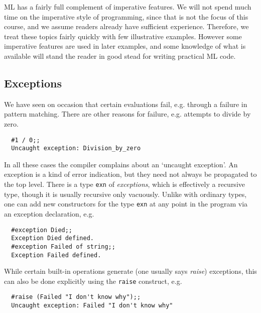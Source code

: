 ML has a fairly full complement of imperative features. We will not spend much
time on the imperative style of programming, since that is not the focus of
this course, and we assume readers already have sufficient experience.
Therefore, we treat these topics fairly quickly with few illustrative examples.
However some imperative features are used in later examples, and some knowledge
of what is available will stand the reader in good stead for writing practical
ML code.

\subsection{Exceptions}

We have seen on occasion that certain evaluations fail, e.g. through a failure
in pattern matching. There are other reasons for failure, e.g. attempts to
divide by zero.

\begin{boxed}\begin{verbatim}
  #1 / 0;;
  Uncaught exception: Division_by_zero
\end{verbatim}\end{boxed}

In all these cases the compiler complains about an `uncaught exception'. An
exception is a kind of error indication, but they need not always be propagated
to the top level. There is a type {\tt exn} of {\em exceptions}, which is
effectively a recursive type, though it is usually recursive only vacuously.
Unlike with ordinary types, one can add new constructors for the type {\tt exn}
at any point in the program via an exception declaration, e.g.

\begin{boxed}\begin{verbatim}
  #exception Died;;
  Exception Died defined.
  #exception Failed of string;;
  Exception Failed defined.
\end{verbatim}\end{boxed}

While certain built-in operations generate (one usually says {\em raise})
exceptions, this can also be done explicitly using the {\tt raise} construct,
e.g.

\begin{boxed}\begin{verbatim}
  #raise (Failed "I don't know why");;
  Uncaught exception: Failed "I don't know why"
\end{verbatim}\end{boxed}

